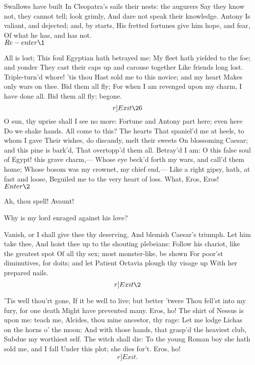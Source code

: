 \documentclass{book}
\begin{document}
 Swallows have built
	In Cleopatra's sails their nests: the augurers
	Say they know not, they cannot tell; look grimly,
	And dare not speak their knowledge. Antony
	Is valiant, and dejected; and, by starts,
	His fretted fortunes give him hope, and fear,
	Of what he has, and has not. \\

	\(Re-enter \1\)

\1	All is lost;
	This foul Egyptian hath betrayed me:
	My fleet hath yielded to the foe; and yonder
	They cast their caps up and carouse together
	Like friends long lost. Triple-turn'd whore! 'tis thou
	Hast sold me to this novice; and my heart
	Makes only wars on thee. Bid them all fly;
	For when I am revenged upon my charm,
	I have done all. Bid them all fly; begone. \[r]Exit \26\]
	O sun, thy uprise shall I see no more:
	Fortune and Antony part here; even here
	Do we shake hands. All come to this? The hearts
	That spaniel'd me at heels, to whom I gave
	Their wishes, do discandy, melt their sweets
	On blossoming Caesar; and this pine is bark'd,
	That overtopp'd them all. Betray'd I am:
	O this false soul of Egypt! this grave charm,---
	Whose eye beck'd forth my wars, and call'd them home;
	Whose bosom was my crownet, my chief end,---
	Like a right gipsy, hath, at fast and loose,
	Beguiled me to the very heart of loss.
	What, Eros, Eros! \\

	\(Enter \2\)

	Ah, thou spell! Avaunt!

\2	Why is my lord enraged against his love?

\1	Vanish, or I shall give thee thy deserving,
	And blemish Caesar's triumph. Let him take thee,
	And hoist thee up to the shouting plebeians:
	Follow his chariot, like the greatest spot
	Of all thy sex; most monster-like, be shown
	For poor'st diminutives, for doits; and let
	Patient Octavia plough thy visage up
	With her prepared nails.  \\	\[r]Exit \2\]

		'Tis well thou'rt gone,
	If it be well to live; but better 'twere
	Thou fell'st into my fury, for one death
	Might have prevented many. Eros, ho!
	The shirt of Nessus is upon me: teach me,
	Alcides, thou mine ancestor, thy rage:
	Let me lodge Lichas on the horns o' the moon;
	And with those hands, that grasp'd the heaviest club,
	Subdue my worthiest self. The witch shall die:
	To the young Roman boy she hath sold me, and I fall
	Under this plot; she dies for't. Eros, ho! \[r]Exit.\]
\end{document}

